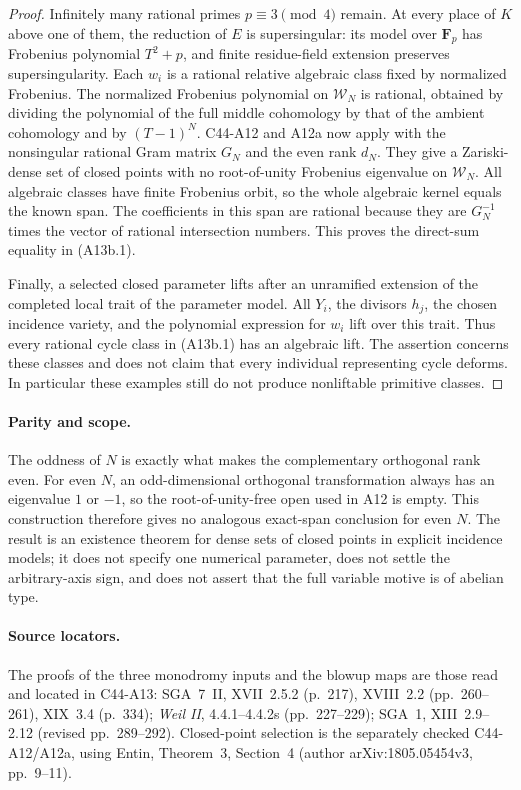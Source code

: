 \documentclass[11pt]{article}
\theoremstyle{remark}\newtheorem{remark}[theorem]{Remark}
\begin{document}
\begin{proof}
Infinitely many rational primes $p\equiv3\pmod4$ remain.
At every place of $K$ above one of them, the reduction of $E$
is supersingular: its model over $\mathbf F_p$ has Frobenius
polynomial $T^2+p$, and finite residue-field extension preserves
supersingularity. Each $w_i$ is a rational relative algebraic
class fixed by normalized Frobenius. The normalized Frobenius
polynomial on $\mathcal W_N$ is rational, obtained by dividing
the polynomial of the full middle cohomology by that of the
ambient cohomology and by $(T-1)^N$. C44-A12 and A12a now
apply with the nonsingular rational Gram matrix $G_N$ and
the even rank $d_N$. They give a Zariski-dense set of closed
points with no root-of-unity Frobenius eigenvalue on
$\mathcal W_N$. All algebraic classes have finite Frobenius
orbit, so the whole algebraic kernel equals the known span.
The coefficients in this span are rational because they are
$G_N^{-1}$ times the vector of rational intersection numbers.
This proves the direct-sum equality in (A13b.1).

Finally, a selected closed parameter lifts after an unramified
extension of the completed local trait of the parameter model.
All $Y_i$, the divisors $h_j$, the chosen incidence variety,
and the polynomial expression for $w_i$ lift over this trait.
Thus every rational cycle class in (A13b.1) has an algebraic
lift. The assertion concerns these classes and does not claim
that every individual representing cycle deforms. In
particular these examples still do not produce nonliftable
primitive classes.
\end{proof}

\paragraph{Parity and scope.}
The oddness of $N$ is exactly what makes the complementary
orthogonal rank even. For even $N$, an odd-dimensional
orthogonal transformation always has an eigenvalue $1$ or
$-1$, so the root-of-unity-free open used in A12 is empty.
This construction therefore gives no analogous exact-span
conclusion for even $N$. The result is an existence theorem
for dense sets of closed points in explicit incidence models;
it does not specify one numerical parameter, does not settle
the arbitrary-axis sign, and does not assert that the full
variable motive is of abelian type.

\paragraph{Source locators.}
The proofs of the three monodromy inputs and the blowup maps
are those read and located in C44-A13: SGA~7~II, XVII~2.5.2
(p.~217), XVIII~2.2 (pp.~260--261), XIX~3.4 (p.~334);
\emph{Weil II}, 4.4.1--4.4.2s (pp.~227--229); SGA~1,
XIII~2.9--2.12 (revised pp.~289--292). Closed-point selection
is the separately checked C44-A12/A12a, using Entin, Theorem~3,
Section~4 (author arXiv:1805.05454v3, pp.~9--11).
\end{document}
